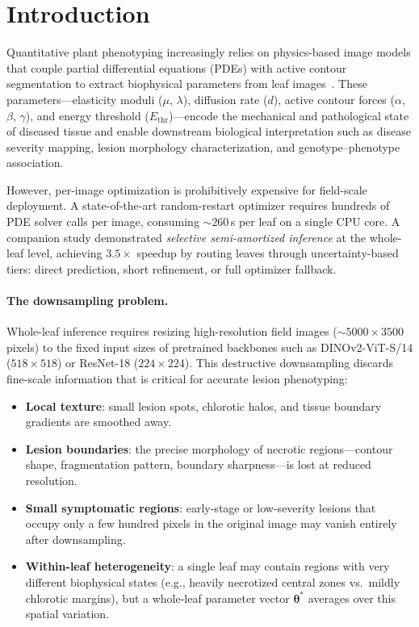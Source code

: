 \documentclass[11pt,a4paper]{article}
\newcommand{\btheta}{\boldsymbol{\theta}}
\begin{document}
\section{Introduction}
\label{sec:intro}

Quantitative plant phenotyping increasingly relies on physics-based image models
that couple partial differential equations (PDEs) with active contour segmentation
to extract biophysical parameters from leaf images~\cite{singh2021plantdoc,mahlein2016plant}.
These parameters---elasticity moduli ($\mu$, $\lambda$), diffusion rate ($d$),
active contour forces ($\alpha$, $\beta$, $\gamma$), and energy threshold ($E_\text{thr}$)---encode
the mechanical and pathological state of diseased tissue and enable
downstream biological interpretation such as disease severity mapping,
lesion morphology characterization, and genotype--phenotype association.

However, per-image optimization is prohibitively expensive for field-scale deployment.
A state-of-the-art random-restart optimizer requires hundreds of PDE solver calls
per image, consuming ${\sim}260$\,s per leaf on a single CPU core.
A companion study demonstrated \emph{selective semi-amortized inference} at the
whole-leaf level, achieving $3.5{\times}$ speedup by routing leaves through
uncertainty-based tiers: direct prediction, short refinement, or full optimizer fallback.

\paragraph{The downsampling problem.}
Whole-leaf inference requires resizing high-resolution field images
(${\sim}5000{\times}3500$ pixels) to the fixed input sizes of pretrained
backbones such as DINOv2-ViT-S/14 ($518{\times}518$) or
ResNet-18 ($224{\times}224$).
This destructive downsampling discards fine-scale information that is
critical for accurate lesion phenotyping:
\begin{itemize}[leftmargin=*,itemsep=1pt]
\item \textbf{Local texture}: small lesion spots, chlorotic halos,
  and tissue boundary gradients are smoothed away.
\item \textbf{Lesion boundaries}: the precise morphology of necrotic
  regions---contour shape, fragmentation pattern, boundary sharpness---is
  lost at reduced resolution.
\item \textbf{Small symptomatic regions}: early-stage or low-severity
  lesions that occupy only a few hundred pixels in the original image
  may vanish entirely after downsampling.
\item \textbf{Within-leaf heterogeneity}: a single leaf may contain
  regions with very different biophysical states (e.g., heavily necrotized
  central zones vs.\ mildly chlorotic margins), but a whole-leaf
  parameter vector $\btheta^*$ averages over this spatial variation.
\end{itemize}
\end{document}
